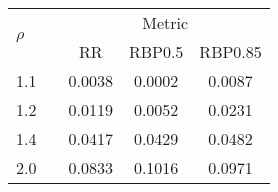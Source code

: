 \renewcommand{\tabcolsep}{0.5em}
\begin{tabular}{l c ccc}
\toprule
\multirow{2}{*}{$\rho$}
	&& \multicolumn{3}{c}{Metric}
\\
\cmidrule{3-5}
	&& RR
		& RBP0.5
			& RBP0.85
\\
\midrule
1.1
	&& 0.0038
		& 0.0002
			& 0.0087
\\
1.2
	&& 0.0119
		& 0.0052
			& 0.0231
\\
1.4
	&& 0.0417
		& 0.0429
			& 0.0482
\\
2.0
	&& 0.0833
		& 0.1016
			& 0.0971
\\
\bottomrule
\end{tabular}
